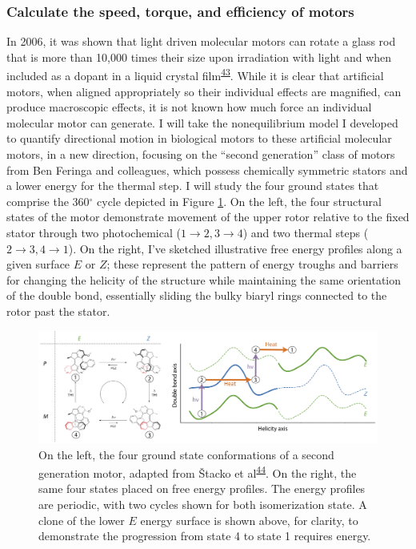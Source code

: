 \documentclass[11pt,notitlepage]{article}
\begin{document}
\hypertarget{calculate-the-speed-torque-and-efficiency-of-motors-1}{%
\subsubsection{Calculate the speed, torque, and efficiency of
motors}\label{calculate-the-speed-torque-and-efficiency-of-motors-1}}

In 2006, it was shown that light driven molecular motors can rotate a
glass rod that is more than 10,000 times their size upon irradiation
with light and when included as a dopant in a liquid crystal
film\textsuperscript{\protect\hyperlink{ref-thFGBz32}{43}}. While it is
clear that artificial motors, when aligned appropriately so their
individual effects are magnified, can produce macroscopic effects, it is
not known how much force an individual molecular motor can generate. I
will take the nonequilibrium model I developed to quantify directional
motion in biological motors to these artificial molecular motors, in a
new direction, focusing on the ``second generation'' class of motors
from Ben Feringa and colleagues, which possess chemically symmetric
stators and a lower energy for the thermal step. I will study the four
ground states that comprise the 360\(^\circ\) cycle depicted in Figure
\ref{fig:motors}. On the left, the four structural states of the motor
demonstrate movement of the upper rotor relative to the fixed stator
through two photochemical (\(1 \rightarrow 2, 3 \rightarrow 4\)) and two
thermal steps (\(2 \rightarrow 3, 4 \rightarrow 1\)). On the right, I've
sketched illustrative free energy profiles along a given surface \(E\)
or \(Z\); these represent the pattern of energy troughs and barriers for
changing the helicity of the structure while maintaining the same
orientation of the double bond, essentially sliding the bulky biaryl
rings connected to the rotor past the stator.

\begin{figure}
\centering
\includegraphics[width=1\textwidth,height=\textheight]{content/images/offset-barriers.png}
\caption{On the left, the four ground state conformations of a second
generation motor, adapted from Štacko et
al\textsuperscript{\protect\hyperlink{ref-mKSNFvW7}{44}}. On the right,
the same four states placed on free energy profiles. The energy profiles
are periodic, with two cycles shown for both isomerization state. A
clone of the lower \(E\) energy surface is shown above, for clarity, to
demonstrate the progression from state 4 to state 1 requires
energy.\label{fig:motors}}
\end{figure}
\end{document}

